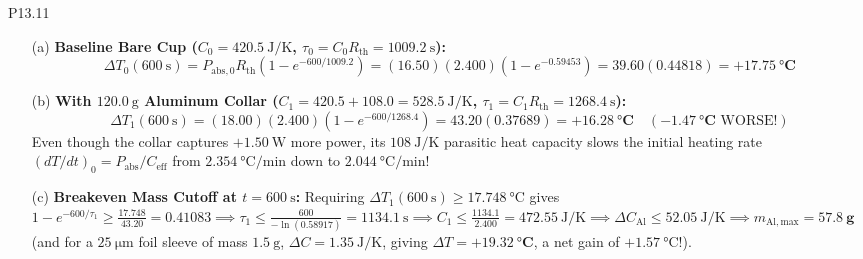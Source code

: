 \begin{solution}{P13.11}
\begin{enumerate}
  \item[(a)] \textbf{Baseline Bare Cup ($C_0 = \SI{420.5}{\joule\per\kelvin}$, $\tau_0 = C_0 R_{\mathrm{th}} = \SI{1009.2}{\second}$):}
  \[
    \Delta T_0(\SI{600}{\second}) = P_{\mathrm{abs},0} R_{\mathrm{th}}\left(1 - e^{-600/1009.2}\right) = (16.50)(2.400)\left(1 - e^{-0.59453}\right) = 39.60(0.44818) = \mathbf{+\SI{17.75}{\celsius}}
  \]
  \item[(b)] \textbf{With $\SI{120.0}{\gram}$ Aluminum Collar ($C_1 = 420.5 + 108.0 = \SI{528.5}{\joule\per\kelvin}$, $\tau_1 = C_1 R_{\mathrm{th}} = \SI{1268.4}{\second}$):}
  \[
    \Delta T_1(\SI{600}{\second}) = (18.00)(2.400)\left(1 - e^{-600/1268.4}\right) = 43.20(0.37689) = \mathbf{+\SI{16.28}{\celsius}} \quad (\mathbf{-\SI{1.47}{\celsius}}\text{ WORSE!})
  \]
  Even though the collar captures $+\SI{1.50}{\watt}$ more power, its $\SI{108}{\joule\per\kelvin}$ parasitic heat capacity slows the initial heating rate $(dT/dt)_0 = P_{\mathrm{abs}}/C_{\mathrm{eff}}$ from $\SI{2.354}{\celsius\per\minute}$ down to $\SI{2.044}{\celsius\per\minute}$!
  \item[(c)] \textbf{Breakeven Mass Cutoff at $t = \SI{600}{\second}$:} Requiring $\Delta T_1(\SI{600}{\second}) \ge \SI{17.748}{\celsius}$ gives $1 - e^{-600/\tau_1} \ge \frac{17.748}{43.20} = 0.41083 \implies \tau_1 \le \frac{600}{-\ln(0.58917)} = \SI{1134.1}{\second} \implies C_1 \le \frac{1134.1}{2.400} = \SI{472.55}{\joule\per\kelvin} \implies \Delta C_{\mathrm{Al}} \le \SI{52.05}{\joule\per\kelvin} \implies m_{\mathrm{Al,max}} = \mathbf{\SI{57.8}{\gram}}$ (and for a $\SI{25}{\micro\meter}$ foil sleeve of mass $\SI{1.5}{\gram}$, $\Delta C = \SI{1.35}{\joule\per\kelvin}$, giving $\Delta T = \mathbf{+\SI{19.32}{\celsius}}$, a net gain of $+\SI{1.57}{\celsius}$!).
\end{enumerate}
\end{solution}

